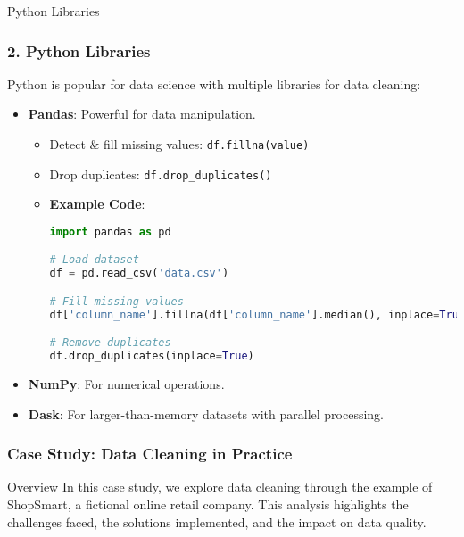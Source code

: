 \documentclass[aspectratio=169]{beamer}
\begin{document}
\begin{frame}[fragile]{Python Libraries}
    \frametitle{2. Python Libraries}
    Python is popular for data science with multiple libraries for data cleaning:
    
    \begin{itemize}
        \item \textbf{Pandas}: Powerful for data manipulation.
            \begin{itemize}
                \item Detect & fill missing values: \texttt{df.fillna(value)}
                \item Drop duplicates: \texttt{df.drop_duplicates()}
                \item \textbf{Example Code}:
                \begin{lstlisting}[language=Python]
import pandas as pd

# Load dataset
df = pd.read_csv('data.csv')

# Fill missing values
df['column_name'].fillna(df['column_name'].median(), inplace=True)

# Remove duplicates
df.drop_duplicates(inplace=True)
                \end{lstlisting}
            \end{itemize}
        \item \textbf{NumPy}: For numerical operations.
        \item \textbf{Dask}: For larger-than-memory datasets with parallel processing.
    \end{itemize}
\end{frame}

\begin{frame}[fragile]
    \frametitle{Case Study: Data Cleaning in Practice}
    
    \begin{block}{Overview}
        In this case study, we explore data cleaning through the example of ShopSmart, a fictional online retail company. 
        This analysis highlights the challenges faced, the solutions implemented, and the impact on data quality.
    \end{block}
\end{frame}
\end{document}
